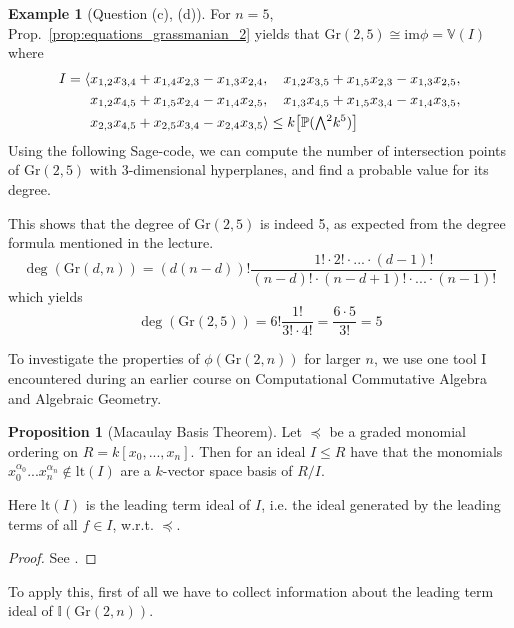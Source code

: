 \documentclass{scrartcl}
\newcommand{\I}{\mathbb{I}}
\newcommand{\V}{\mathbb{V}}
\newcommand{\Proj}{\mathbb{P}}
\newcommand{\Gr}{\mathrm{Gr}}
\newcommand{\extpow}{\mathchoice{{\textstyle\bigwedge}}
    {{\bigwedge}}
    {{\textstyle\wedge}}
    {{\scriptstyle\wedge}}}
\theoremstyle{definition}
\newtheorem{example}[subsection]{Example}
\newtheorem{proposition}[subsection]{Proposition}
\begin{document}
\begin{example}[Question (c), (d)]
    For $n = 5$, Prop.~\ref{prop:equations_grassmanian_2} yields that $\Gr(2, 5) \cong \mathrm{im}\phi = \V(I)$ where
    \begin{align*}
        I = \langle &x_{1, 2} x_{3, 4} + x_{1, 4} x_{2, 3} - x_{1, 3} x_{2, 4}, \quad x_{1, 2} x_{3, 5} + x_{1, 5} x_{2, 3} - x_{1, 3} x_{2, 5}, \\
        &x_{1, 2} x_{4, 5} + x_{1, 5} x_{2, 4} - x_{1, 4} x_{2, 5}, \quad x_{1, 3} x_{4, 5} + x_{1, 5} x_{3, 4} - x_{1, 4} x_{3, 5}, \\ 
        &x_{2, 3} x_{4, 5} + x_{2, 5} x_{3, 4} - x_{2, 4} x_{3, 5} \rangle \leq k\bigl[ \Proj(\extpow^2 k^5) \bigr]
    \end{align*}
    Using the following Sage-code, we can compute the number of intersection points of $\Gr(2, 5)$ with 3-dimensional hyperplanes, and find a probable value for its degree.
    
    This shows that the degree of $\Gr(2, 5)$ is indeed 5, as expected from the degree formula mentioned in the lecture.
    \begin{equation*}
        \deg(\Gr(d, n)) = (d(n - d))! \frac {1! \cdot 2! \cdot ... \cdot (d - 1)!} {(n - d)! \cdot (n - d + 1)! \cdot ... \cdot (n - 1)!}
    \end{equation*}
    which yields
    \begin{equation*}
        \deg(\Gr(2, 5)) = 6! \frac {1!} {3! \cdot 4!} = \frac {6 \cdot 5} {3!} = 5
    \end{equation*}
\end{example}
To investigate the properties of $\phi(\Gr(2, n))$ for larger $n$, we use one tool I encountered during an earlier course on Computational Commutative Algebra and Algebraic Geometry.
\begin{proposition}[Macaulay Basis Theorem]
    \label{prop:macaulay_basis_theorem}
    Let $\preceq$ be a graded monomial ordering on $R = k[x_0, ..., x_n]$.
    Then for an ideal $I \leq R$ have that the monomials $x_0^{\alpha_0} ... x_n^{\alpha_n} \notin \mathrm{lt}(I)$ are a $k$-vector space basis of $R/I$.

    Here $\mathrm{lt}(I)$ is the leading term ideal of $I$, i.e. the ideal generated by the leading terms of all $f \in I$, w.r.t. $\preceq$.
\end{proposition}
\begin{proof}
    See \cite{kreuzer}.
\end{proof}
To apply this, first of all we have to collect information about the leading term ideal of $\I(\Gr(2, n))$.
\end{document}
